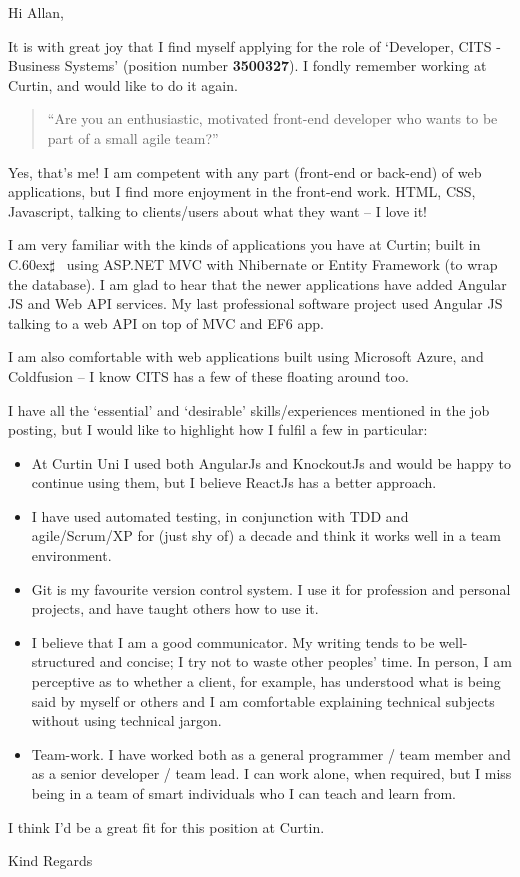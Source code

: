 \documentclass[a4paper]{letter}
\def\Csharp{%
    C\raise.60ex\hbox{$\sharp$}%
\spacefactor1000 }
\begin{document}
\begin{letter}{}

\signature{Royce Townsend}

\opening{Hi Allan,}

It is with great joy that I find myself applying for the role of `Developer, CITS - Business Systems' (position number \textbf{3500327}). I fondly remember working at Curtin, and would like to do it again.

\begin{quote}
  ``Are you an enthusiastic, motivated front-end developer who wants to be part of a small agile team?''
\end{quote}

Yes, that's me! I am competent with any part (front-end or back-end) of web applications, but I find more enjoyment in the front-end work. HTML, CSS, Javascript, talking to clients/users about what they want -- I love it!

I am very familiar with the kinds of applications you have at Curtin; built in \Csharp\  using ASP.NET MVC with Nhibernate or Entity Framework (to wrap the database). I am glad to hear that the newer applications have added Angular JS and Web API services. My last professional software project used Angular JS talking to a web API on top of MVC and EF6 app.

I am also comfortable with web applications built using Microsoft Azure, and Coldfusion -- I know CITS has a few of these floating around too.

I have all the `essential' and `desirable' skills/experiences mentioned in the job posting, but I would like to highlight how I fulfil a few in particular:

  \begin{itemize}
    \item At Curtin Uni I used both AngularJs and KnockoutJs and would be happy to continue using them, but I believe ReactJs has a better approach.
    \item I have used automated testing, in conjunction with TDD and agile/Scrum/XP for (just shy of) a decade and think it works well in a team environment.
    \item Git is my favourite version control system. I use it for profession and personal projects, and have taught others how to use it.
    \item I believe that I am a good communicator. My writing tends to be well-structured and concise; I try not to waste other peoples' time. In person, I am perceptive as to whether a client, for example, has understood what is being said by myself or others and I am comfortable explaining technical subjects without using technical jargon.
    \item Team-work. I have worked both as a general programmer / team member and as a senior developer / team lead. I can work alone, when required, but I miss being in a team of smart individuals who I can teach and learn from.
  \end{itemize}

I think I'd be a great fit for this position at Curtin.

\closing{Kind Regards}

\end{letter}
\end{document}
